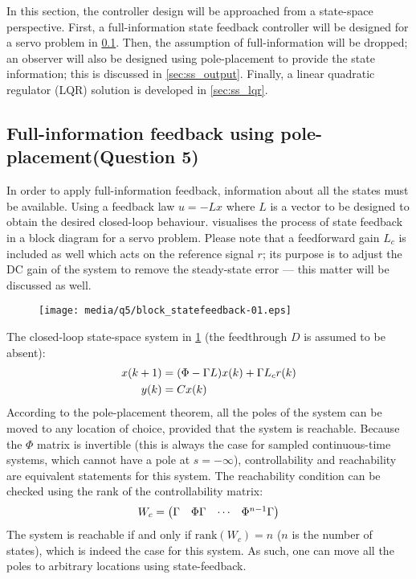 In this section, the controller design will be approached from a state-space perspective. First, a full-information state feedback controller will be designed for a servo problem in \cref{sec:ss_full}. Then, the assumption of full-information will be dropped; an observer will also be designed using pole-placement to provide the state information; this is discussed in \cref{sec:ss_output}. Finally, a linear quadratic regulator (LQR) solution is developed in \cref{sec:ss_lqr}.

\subsection{Full-information feedback using pole-placement\textnormal{\phantom{xxx}(Question 5)}}
\label{sec:ss_full}
In order to apply full-information feedback, information about all the states must be available. Using a feedback law $u = -Lx$ where $L$ is a vector to be designed to obtain the desired closed-loop behaviour.  visualises the process of state feedback in a block diagram for a servo problem. Please note that a feedforward gain $L_c$ is included as well which acts on the reference signal $r$; its purpose is to adjust the DC gain of the system to remove the steady-state error --- this matter will be discussed as well.
\begin{figure}[ht]
    \centering
    \texttt{[image: media/q5/block\_statefeedback-01.eps]}
    \caption{}
    \label{fig:q5_block_statefeedback}
\end{figure}
The closed-loop state-space system in \cref{fig:q5_block_statefeedback}  (the feedthrough $D$ is assumed to be absent):
\begin{equation}
    \begin{aligned}
        x(k+1) &= \qty(\Phi - \Gamma L)x(k) + \Gamma L_c r(k)\\
        y(k) &= Cx(k)\\
    \end{aligned}
\end{equation}
According to the pole-placement theorem, all the poles of the system can be moved to any location of choice, provided that the system is reachable. Because the $\Phi$ matrix is invertible (this is always the case for sampled continuous-time systems, which cannot have a pole at $s = -\infty$), controllability and reachability are equivalent statements for this system. The reachability condition can be checked using the rank of the controllability matrix:
$$ W_c = \mqty(\Gamma & \Phi \Gamma & \cdots & \Phi^{n-1}\Gamma)$$
The system is reachable if and only if $\mathrm{rank}(W_c) = n$ ($n$ is the number of states), which is indeed the case for this system. As such, one can move all the poles to arbitrary locations using state-feedback.

